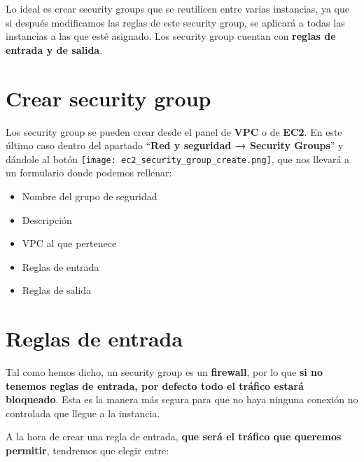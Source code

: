 Lo ideal es crear security groups que se reutilicen entre varias instancias, ya que si después modificamos las reglas de este security group, se aplicará a todas las instancias a las que esté asignado. Los security group cuentan con \textbf{reglas de entrada y de salida}.

\section{Crear security group}

Los security group se pueden crear desde el panel de \textbf{VPC} o de \textbf{EC2}. En este último caso dentro del apartado “\textbf{Red y seguridad → Security Groups}” y dándole al botón \texttt{[image: ec2\_security\_group\_create.png]}, que nos llevará a un formulario donde podemos rellenar:

\begin{itemize}
	\item Nombre del grupo de seguridad
	\item Descripción
	\item VPC al que pertenece
	\item Reglas de entrada
	\item Reglas de salida
\end{itemize}

\section{Reglas de entrada}

Tal como hemos dicho, un security group es un \textbf{firewall}, por lo que \textbf{si no tenemos reglas de entrada, por defecto todo el tráfico estará bloqueado}. Esta es la manera más segura para que no haya ninguna conexión no controlada que llegue a la instancia.


A la hora de crear una regla de entrada, \textbf{que será el tráfico que queremos permitir}, tendremos que elegir entre:


